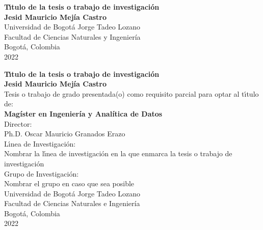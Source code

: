\begin{center}
\begin{figure}
\centering%
%
\end{figure}
\thispagestyle{empty} \vspace*{2.0cm} \textbf{\huge
T\'{\i}tulo de la tesis  o trabajo de investigaci\'{o}n}\\[6.0cm]
\Large\textbf{Jesid Mauricio Mej\'{i}a Castro}\\[6.0cm]
\small Universidad de Bogot\'{a} Jorge Tadeo Lozano\\
Facultad de Ciencias Naturales y Ingenier\'{i}a\\
Bogot\'{a}, Colombia\\
2022\\
\end{center}

\newpage{\pagestyle{empty}\cleardoublepage}

\newpage
\begin{center}
\thispagestyle{empty} \vspace*{0cm} \textbf{\huge
T\'{\i}tulo de la tesis  o trabajo de investigaci\'{o}n}\\[3.0cm]
\Large\textbf{Jesid Mauricio Mej\'{i}a Castro}\\[3.0cm]
\small Tesis o trabajo de grado presentada(o) como requisito parcial para optar al
t\'{\i}tulo de:\\
\textbf{Mag\'{i}ster en Ingenier\'{i}a y Anal\'{i}tica de Datos}\\[2.5cm]
Director:\\
Ph.D. Oscar Mauricio Granados Erazo\\[2.0cm]
L\'{\i}nea de Investigaci\'{o}n:\\
Nombrar la l\'{\i}nea de investigaci\'{o}n en la que enmarca la tesis  o trabajo de investigaci\'{o}n\\
Grupo de Investigaci\'{o}n:\\
Nombrar el grupo en caso que sea posible\\[2.5cm]
Universidad de Bogot\'{a} Jorge Tadeo Lozano\\
Facultad de Ciencias Naturales e Ingenier\'{i}a\\
Bogot\'{a}, Colombia\\
2022\\
\end{center}

\newpage{\pagestyle{empty}\cleardoublepage}

